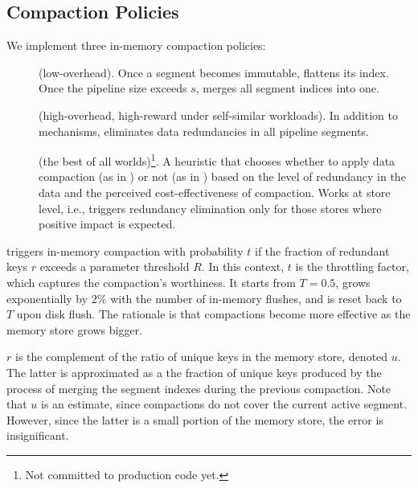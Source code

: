 \subsection{Compaction Policies} \label{ssec:policies}

We implement three in-memory compaction policies: 
\begin{description}
\item[\basic] (low-overhead). Once a segment becomes immutable, flattens its index. Once the pipeline size exceeds $s$, 
merges all segment indices into one.  
\item[\eager] (high-overhead, high-reward under self-similar workloads). 
In addition to \basic\/ mechanisms, eliminates data redundancies in all pipeline segments.
\item[\adp] (the best of all worlds)\footnote{\small{Not committed to production code yet.}}. A heuristic that chooses 
whether to apply data compaction (as in \eager) or not (as in \basic) based on the level of redundancy in the data 
and the perceived cost-effectiveness of compaction. Works at store level, i.e., triggers redundancy elimination 
only for those stores where positive impact is expected. 
\end{description}

\adp\/ triggers in-memory compaction with probability $t$ if the fraction of redundant keys $r$ exceeds a parameter 
threshold $R$. In this context, $t$ is the throttling factor, which captures the compaction's worthiness. It starts from 
$T=0.5$, grows exponentially by $2\%$ with the number of in-memory flushes, and is reset back to $T$ upon
disk flush. The rationale is that compactions become more effective as the memory store grows bigger. 

$r$ is the complement of the ratio of unique keys in the memory store, denoted  $u$. The latter is approximated 
as a the fraction of unique keys produced by the process of merging the segment indexes during the previous compaction. 
Note that $u$ is an estimate, since compactions do not cover the current active segment. However, since the latter is a small 
portion of the memory store, the error is insignificant. 

